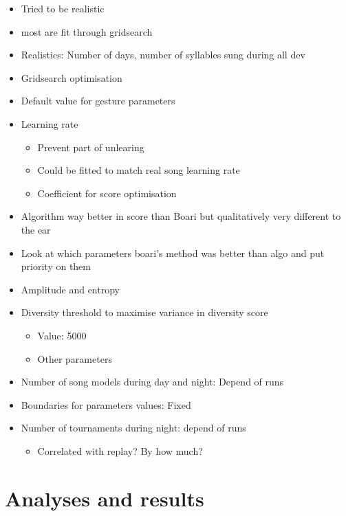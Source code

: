 \begin{itemize}
\tightlist
\item
  Tried to be realistic
\item
  most are fit through gridsearch
\item
  Realistics: Number of days, number of syllables sung during all dev
\item
  Gridsearch optimisation
\item
  Default value for gesture parameters
\item
  Learning rate

  \begin{itemize}
  \tightlist
  \item
    Prevent part of unlearing
  \item
    Could be fitted to match real song learning rate
  \item
    Coefficient for score optimisation
  \end{itemize}
\item
  Algorithm way better in score than Boari but qualitatively very
  different to the ear
\item
  Look at which parameters boari's method was better than algo and put
  priority on them
\item
  Amplitude and entropy
\item
  Diversity threshold to maximise variance in diversity score

  \begin{itemize}
  \tightlist
  \item
    Value: 5000
  \item
    Other parameters
  \end{itemize}
\item
  Number of song models during day and night: Depend of runs
\item
  Boundaries for parameters values: Fixed
\item
  Number of tournaments during night: depend of runs

  \begin{itemize}
  \tightlist
  \item
    Correlated with replay? By how much?
  \end{itemize}
\end{itemize}

\chapter{Analyses and results}\label{analyses-and-results}

